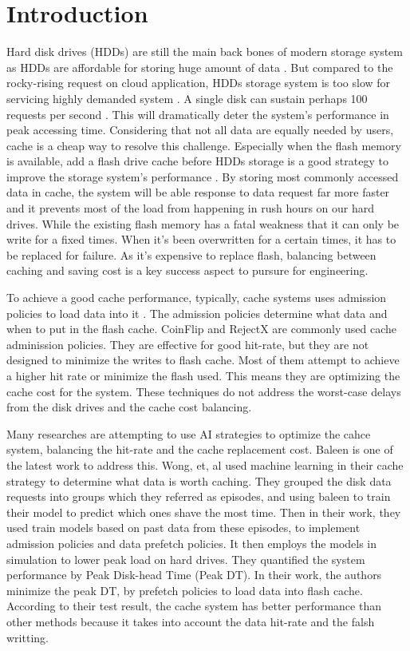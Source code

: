 \section{Introduction}
Hard disk drives (HDDs) are still the main back bones of modern storage system as HDDs are affordable for storing huge amount of data \cite{akhtar2019avic}. But compared to the rocky-rising request on cloud application, HDDs storage system is too slow for servicing highly demanded system \cite{armenatzoglou2022redshift}. A single disk can sustain perhaps 100 requests per second \cite{beckmann2018lhd}. This will dramatically deter the system's performance in peak accessing time. Considering that not all data are equally needed by users, cache is a cheap way to resolve this challenge. Especially when the flash memory is available, add a flash drive cache before HDDs storage is a good strategy to improve the storage system's performance \cite{berger2017adaptsize}. By storing most commonly accessed data in cache, the system will be able response to data request far more faster and it prevents most of the load from happening in rush hours on our hard drives. While the existing flash memory has a fatal weakness that it can only be write for a fixed times. When it's been overwritten for a certain times, it has to be replaced for failure. As it’s expensive to replace flash, balancing between caching and saving cost is a key success aspect to pursure for engineering.

To achieve a good cache performance, typically, cache systems uses admission policies to load data into it \cite{chakraborttii2021flash}. The admission policies determine what data and when to put in the flash cache. CoinFlip\cite{belady1966replacement} and RejectX\cite{berger2018lightweight} are commonly used cache adminission policies. They are effective for good hit-rate, but they are not designed to minimize the writes to flash cache. Most of them attempt to achieve a higher hit rate or minimize the flash used. This means they are optimizing the cache cost for the system. These techniques do not address the worst-case delays from the disk drives and the cache cost balancing.

Many researches are attempting to use AI strategies to optimize the cahce system, balancing the hit-rate and the cache replacement cost. Baleen \cite{wong2024baleen} is one of the latest work to address this. Wong, et, al used machine learning in their cache strategy to determine what data is worth caching. They grouped the disk data requests into groups which they referred as episodes, and using baleen to train their model to predict which ones shave the most time. Then in their work, they used train models based on past data from these episodes, to implement admission policies and data prefetch policies. It then employs the models in simulation to lower peak load on hard drives. They quantified the system performance by Peak Disk-head Time (Peak DT). In their work\cite{wong2024baleen}, the authors minimize the peak DT, by prefetch policies to load data into flash cache. According to their test result, the cache system has better performance than other methods because it takes into account the data hit-rate and the falsh writting. 

